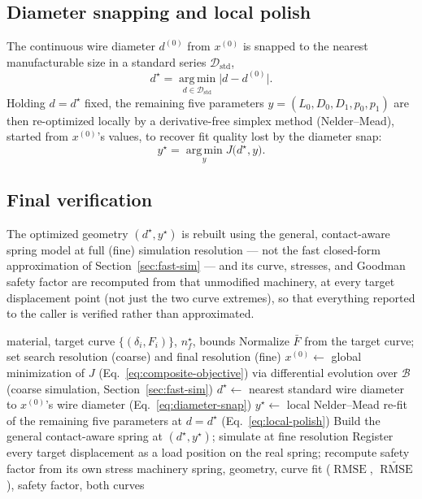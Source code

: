 \documentclass[11pt]{article}
\DeclareMathOperator{\RMSE}{RMSE}
\begin{document}
\subsection{Diameter snapping and local polish}

The continuous wire diameter $d^{(0)}$ from $x^{(0)}$ is snapped to the
nearest manufacturable size in a standard series $\mathcal{D}_{\mathrm{std}}$,
\begin{equation}
d^{\star} = \operatorname*{arg\,min}_{d \in \mathcal{D}_{\mathrm{std}}} \big|d - d^{(0)}\big| .
\label{eq:diameter-snap}
\end{equation}
Holding $d=d^{\star}$ fixed, the remaining five parameters
$y = (L_0,D_0,D_1,p_0,p_1)$ are then re-optimized locally by a
derivative-free simplex method (Nelder--Mead), started from $x^{(0)}$'s
values, to recover fit quality lost by the diameter snap:
\begin{equation}
y^{\star} = \operatorname*{arg\,min}_{y} J\big(d^{\star}, y\big).
\label{eq:local-polish}
\end{equation}

\subsection{Final verification}

The optimized geometry $(d^{\star}, y^{\star})$ is rebuilt using the
general, contact-aware spring model at full (fine) simulation resolution
— not the fast closed-form approximation of Section~\ref{sec:fast-sim} —
and its curve, stresses, and Goodman safety factor are recomputed from
that unmodified machinery, at every target displacement point (not just
the two curve extremes), so that everything reported to the caller is
verified rather than approximated.

\begin{algorithm}[h]
\caption{Curve-fitting inverse design of a linear-taper conical spring}
\begin{algorithmic}[1]
\Require material, target curve $\{(\delta_i,F_i)\}$, $n_f^{\star}$, bounds
\State Normalize $\bar F$ from the target curve; set search resolution (coarse) and final resolution (fine)
\State $x^{(0)} \gets$ global minimization of $J$ (Eq.~\eqref{eq:composite-objective}) via differential evolution over $\mathcal{B}$ (coarse simulation, Section~\ref{sec:fast-sim})
\State $d^{\star} \gets$ nearest standard wire diameter to $x^{(0)}$'s wire diameter (Eq.~\eqref{eq:diameter-snap})
\State $y^{\star} \gets$ local Nelder--Mead re-fit of the remaining five parameters at $d=d^{\star}$ (Eq.~\eqref{eq:local-polish})
\State Build the general contact-aware spring at $(d^{\star},y^{\star})$; simulate at fine resolution
\State Register every target displacement as a load position on the real spring; recompute safety factor from its own stress machinery
\State \Return spring, geometry, curve fit ($\RMSE$, $\widetilde{\RMSE}$), safety factor, both curves
\end{algorithmic}
\end{algorithm}
\end{document}
